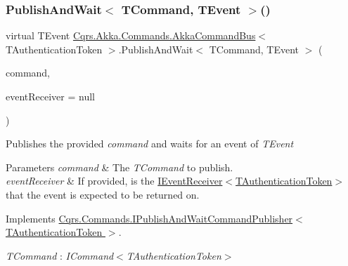 \subsubsection{\texorpdfstring{Publish\+And\+Wait$<$ T\+Command, T\+Event $>$()}{PublishAndWait< TCommand, TEvent >()}\hspace{0.1cm}{\footnotesize\ttfamily [1/6]}}
{\footnotesize\ttfamily virtual T\+Event \hyperlink{classCqrs_1_1Akka_1_1Commands_1_1AkkaCommandBus}{Cqrs.\+Akka.\+Commands.\+Akka\+Command\+Bus}$<$ T\+Authentication\+Token $>$.Publish\+And\+Wait$<$ T\+Command, T\+Event $>$ (\begin{DoxyParamCaption}\item[{T\+Command}]{command,  }\item[{\hyperlink{interfaceCqrs_1_1Events_1_1IEventReceiver}{I\+Event\+Receiver}$<$ T\+Authentication\+Token $>$}]{event\+Receiver = {\ttfamily null} }\end{DoxyParamCaption})\hspace{0.3cm}{\ttfamily [virtual]}}



Publishes the provided {\itshape command}  and waits for an event of {\itshape T\+Event}  


\begin{DoxyParams}{Parameters}
{\em command} & The {\itshape T\+Command}  to publish.\\
\hline
{\em event\+Receiver} & If provided, is the \hyperlink{interfaceCqrs_1_1Events_1_1IEventReceiver}{I\+Event\+Receiver$<$\+T\+Authentication\+Token$>$} that the event is expected to be returned on.\\
\hline
\end{DoxyParams}


Implements \hyperlink{interfaceCqrs_1_1Commands_1_1IPublishAndWaitCommandPublisher_a19ffb318c830e9f05d4adae985232f30_a19ffb318c830e9f05d4adae985232f30}{Cqrs.\+Commands.\+I\+Publish\+And\+Wait\+Command\+Publisher$<$ T\+Authentication\+Token $>$}.

\begin{Desc}
\item[Type Constraints]\begin{description}
\item[{\em T\+Command} : {\em I\+Command$<$T\+Authentication\+Token$>$}]\end{description}
\end{Desc}
\mbox{\label{classCqrs_1_1Akka_1_1Commands_1_1AkkaCommandBus_a7f820323e5293e476f4afee7c731f7a3_a7f820323e5293e476f4afee7c731f7a3}} 

